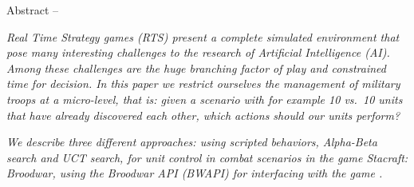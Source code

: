 \begin{bfseries} Abstract -- \end{bfseries}
\emph{
Real Time Strategy games (RTS) present a complete simulated environment that pose many interesting challenges to the research of Artificial Intelligence (AI).
Among these challenges are the huge branching factor of play and constrained time for decision.
In this paper we restrict ourselves the management of military troops at a micro-level, that is: given a scenario with for example 10 vs.\ 10 units that have already discovered each other, which actions should our units perform?
}

\emph{
We describe three different approaches: using scripted behaviors, Alpha-Beta search and UCT search, for unit control in combat scenarios in the game Stacraft: Broodwar, using the Broodwar API (BWAPI) for interfacing with the game \cite{BWAPI}.
}
